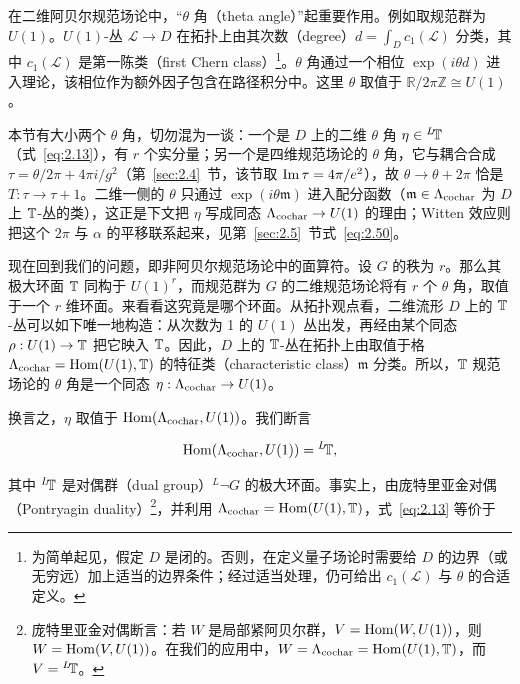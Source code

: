 在二维阿贝尔规范场论中，“$\theta$ 角（theta angle）”起重要作用。例如取规范群为 $U(1)$。$U(1)$-丛 ${\mathcal L}\to D$ 在拓扑上由其次数（degree）$d=\int_D c_1({\mathcal L})$ 分类，其中 $c_1({\mathcal L})$ 是第一陈类（first Chern class）\footnote{为简单起见，假定 $D$ 是闭的。否则，在定义量子场论时需要给 $D$ 的边界（或无穷远）加上适当的边界条件；经过适当处理，仍可给出 $c_1({\mathcal L})$ 与 $\theta$ 的合适定义。}。$\theta$ 角通过一个相位 $\exp(i\theta d)$ 进入理论，该相位作为额外因子包含在路径积分中。这里 $\theta$ 取值于 $\mathbb{R}/2\pi\mathbb{Z}\cong U(1)$。

\begin{yizhu}[易错点]
本节有大小两个 $\theta$ 角，切勿混为一谈：一个是 $D$ 上的二维 $\theta$ 角 $\eta\in{}^L\negthinspace{\mathbb{T}}$（式~\eqref{eq:2.13}），有 $r$ 个实分量；另一个是四维规范场论的 $\theta$ 角，它与耦合合成 $\tau=\theta/2\pi+4\pi i/g^2$（第~\ref{sec:2.4}~节，该节取 ${\rm Im}\,\tau=4\pi/e^2$），故 $\theta\to\theta+2\pi$ 恰是 $T:\tau\to\tau+1$。二维一侧的 $\theta$ 只通过 $\exp(i\theta\mathfrak m)$ 进入配分函数（$\mathfrak m\in\Lambda_{\rm cochar}$ 为 $D$ 上 ${\mathbb{T}}$-丛的类），这正是下文把 $\eta$ 写成同态 $\Lambda_{\rm cochar}\to U(1)$ 的理由；Witten 效应则把这个 $2\pi$ 与 $\alpha$ 的平移联系起来，见第~\ref{sec:2.5}~节式~\eqref{eq:2.50}。
\end{yizhu}

现在回到我们的问题，即非阿贝尔规范场论中的面算符。设 $G$ 的秩为 $r$。那么其极大环面 ${\mathbb{T}}$ 同构于 $U(1)^r$，而规范群为 $G$ 的二维规范场论将有 $r$ 个 $\theta$ 角，取值于一个 $r$ 维环面。来看看这究竟是哪个环面。从拓扑观点看，二维流形 $D$ 上的 ${\mathbb{T}}$-丛可以如下唯一地构造：从次数为 1 的 $U(1)$ 丛出发，再经由某个同态 $\rho:U(1)\to {\mathbb{T}}$ 把它映入 ${\mathbb{T}}$。因此，$D$ 上的 ${\mathbb{T}}$-丛在拓扑上由取值于格 $\Lambda_{\rm cochar}={\rm Hom}(U(1),{\mathbb{T}})$ 的特征类（characteristic class）$\mathfrak{m}$ 分类。所以，${\mathbb{T}}$ 规范场论的 $\theta$ 角是一个同态 $\eta:\Lambda_{\rm cochar}\to U(1)$。

换言之，$\eta$ 取值于 ${\rm Hom}(\Lambda_{\rm cochar},U(1))$。我们断言

\setcounter{equation}{12}
\begin{equation}\label{eq:2.13}
  {\rm Hom}(\Lambda_{\rm cochar},U(1))={}^L\negthinspace {\mathbb{T}},
\end{equation}

 其中 $^L\negthinspace {\mathbb{T}}$ 是对偶群（dual group）$^L\neg G$ 的极大环面。事实上，由庞特里亚金对偶（Pontryagin duality）\footnote{庞特里亚金对偶断言：若 $W$ 是局部紧阿贝尔群，$V={\rm Hom}(W,U(1))$，则 $W={\rm Hom}(V,U(1))$。在我们的应用中，$W=\Lambda_{\rm cochar}={\rm Hom}(U(1),{\mathbb{T}})$，而 $V={}^L\negthinspace {\mathbb{T}}$。}，并利用 $\Lambda_{\rm cochar}={\rm Hom}(U(1),{\mathbb{T}})$，式~\eqref{eq:2.13} 等价于

